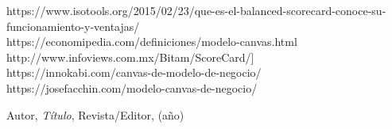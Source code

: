 \begin{thebibliography}{99}
https://www.isotools.org/2015/02/23/que-es-el-balanced-scorecard-conoce-su-funcionamiento-y-ventajas/\\
https://economipedia.com/definiciones/modelo-canvas.html\\
http://www.infoviews.com.mx/Bitam/ScoreCard/]\\
https://innokabi.com/canvas-de-modelo-de-negocio/\\
https://josefacchin.com/modelo-canvas-de-negocio/

 Autor, \emph{Título}, Revista/Editor, (año)

\end{thebibliography}


